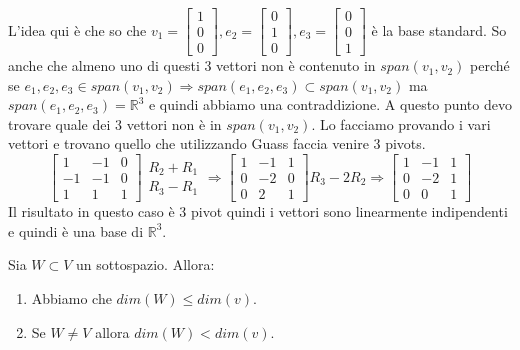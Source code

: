 \begin{example}
\begin{itemize}
    L'idea qui è che so che $v_1 = \begin{bmatrix}1\\0\\0\end{bmatrix}, e_2 = \begin{bmatrix}0\\1\\0\end{bmatrix}, e_3 = \begin{bmatrix}0\\0\\1\end{bmatrix}$ è la base standard. So anche che almeno uno di questi 3 vettori non è contenuto in $span(v_1, v_2)$ perché se $e_1, e_2, e_3 \in span(v_1, v_2) \Longrightarrow span(e_1, e_2, e_3) \subset span(v_1, v_2)$ ma $span(e_1, e_2, e_3) = \mathbb{R}^3$ e quindi abbiamo una contraddizione. A questo punto devo trovare quale dei 3 vettori non è in $span(v_1, v_2)$. Lo facciamo provando i vari vettori e trovano quello che utilizzando Guass faccia venire 3 pivots.
    \[
    \begin{bmatrix}
        1 & -1 & 0\\
        -1 & -1 & 0\\
        1 & 1 & 1
    \end{bmatrix}
    \begin{array}{l}
        R_2 + R_1\\
        R_3 - R_1
    \end{array}
    \Rightarrow
    \begin{bmatrix}
        1 & -1 & 1\\
        0 & -2 & 0\\
        0 & 2 & 1
    \end{bmatrix}
    R_3 - 2R_2
    \Rightarrow
    \begin{bmatrix}
        1 & -1 & 1\\
        0 & -2 & 1\\
        0 & 0 & 1
    \end{bmatrix}
    \]
    Il risultato in questo caso è 3 pivot quindi i vettori sono linearmente indipendenti e quindi è una base di $\mathbb{R}^3$.
\end{itemize}
\end{example}

\begin{proposition}
Sia $W \subset V$ un sottospazio. Allora:
\begin{enumerate}
    \item Abbiamo che $dim(W) \leq dim(v)$.
    \item Se $W \neq V$ allora $dim(W) < dim(v)$.
\end{enumerate}
\end{proposition}

